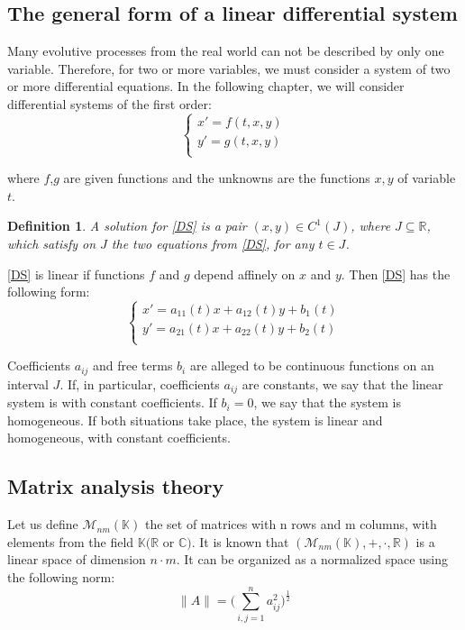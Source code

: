 \documentclass[a4paper,11pt]{report}
\newtheorem{definition}{Definition}[subsection]
\newcommand{\R}{\mathbb{R}}
\begin{document}
\subsection{The general form of a linear differential system}
Many evolutive processes from the real world can not be described by only one variable. Therefore, for two or more variables, we must consider a system 
of two or more differential equations. In the following chapter, we will consider differential systems of the first order:
\begin{equation}
\begin{cases}
 x'=f(t,x,y)\\ 
 y'=g(t,x,y)\\
\end{cases}
 \label{DS}\tag{DS}
\end{equation}

where $f$,$g$ are given functions and the unknowns are the functions $x,y$ of variable $t$. \\

\begin{definition} 
A solution for \eqref{DS} is a pair $(x,y)\in C^{1}(J)$, where $J\subseteq \R$, which satisfy on $J$ the two equations from \eqref{DS}, for 
any $t\in J$. 
\end{definition}
 
\eqref{DS} is linear if functions $f$ and $g$ depend affinely on $x$ and $y$. Then \eqref{DS} has the following form:
\begin{equation}
 \begin{cases}
  x'=a_{11}(t)x+a_{12}(t)y+b_{1}(t)\\
  y'=a_{21}(t)x+a_{22}(t)y+b_{2}(t)\\
 \end{cases}
\label{DS*}\tag{DS*}
\end{equation}

Coefficients $a_{ij}$ and free terms $b_{i}$ are alleged to be continuous functions on an interval $J$. If, in particular, coefficients $a_{ij}$
are constants, we say that the linear system is with constant coefficients. If $b_{i}=0$, we say that the system is homogeneous. If both situations
take place, the system is linear and homogeneous, with constant coefficients.

\subsection{Matrix analysis theory}

Let us define $\mathcal{M}_{nm}(\mathbb{K})$ the set of matrices with n rows and m columns, with elements from the field $\mathbb{K} (\R$ or $\mathbb{C})$. It is known that $(\mathcal{M}_{nm}(\mathbb{K}), +, \cdot, \R)$ is a linear space of dimension $n\cdot m$. It can be organized as a normalized space using the following norm:
\begin{equation*}
 \rVert A \rVert = \bigg( \sum_{i,j=1}^{n} a_{ij}^{2} \bigg)^\frac{1}{2}
\end{equation*}
\end{document}
